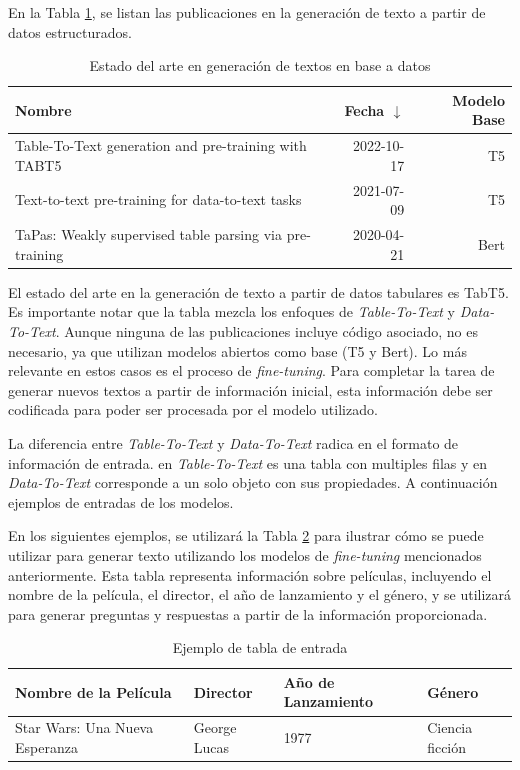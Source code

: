 En la Tabla \ref{tab-sota-text}, se listan las publicaciones en la generación de texto a partir de datos estructurados.

\begin{table}[H]
	\centering
	\caption{Estado del arte en generación de textos en base a datos}
	\label{tab-sota-text}
    \begin{tabular}{|m{20em}|r|r|}
        \hline
        \rowcolor[gray]{0.8}
        Nombre & Fecha $\downarrow$ & Modelo Base \\
        \hline
        Table-To-Text generation and pre-training with TABT5 \cite{andrejczuk_table--text_2022}
        & 2022-10-17
        & T5 \\
        \hline
        Text-to-text pre-training for data-to-text tasks \cite{kale_text--text_2020}
        & 2021-07-09
        & T5 \\
        \hline
        TaPas: Weakly supervised table parsing via pre-training \cite{herzig_tapas_2020}
        & 2020-04-21
        & Bert \\
        \hline
    \end{tabular}
\end{table}

El estado del arte en la generación de texto a partir de datos tabulares es TabT5. Es importante notar que la tabla mezcla los enfoques de \emph{Table-To-Text} y \emph{Data-To-Text}. Aunque ninguna de las publicaciones incluye código asociado, no es necesario, ya que utilizan modelos abiertos como base (T5 y Bert). Lo más relevante en estos casos es el proceso de \emph{fine-tuning}. Para completar la tarea de generar nuevos textos a partir de información inicial, esta información debe ser codificada para poder ser procesada por el modelo utilizado.

La diferencia entre \emph{Table-To-Text} y \emph{Data-To-Text} radica en el formato de información de entrada. en \emph{Table-To-Text} es una tabla con multiples filas y en \emph{Data-To-Text} corresponde a un solo objeto con sus propiedades. A continuación ejemplos de entradas de los modelos.


En los siguientes ejemplos, se utilizará la Tabla \ref{tabla-ejemplo-inputs} para ilustrar cómo se puede utilizar para generar texto utilizando los modelos de \emph{fine-tuning} mencionados anteriormente. Esta tabla representa información sobre películas, incluyendo el nombre de la película, el director, el año de lanzamiento y el género, y se utilizará para generar preguntas y respuestas a partir de la información proporcionada.
\begin{table}[H]
	\centering
	\caption{Ejemplo de tabla de entrada}
	\label{tabla-ejemplo-inputs}
    \begin{tabular}{|l|l|l|l|}
        \hline
        \rowcolor[gray]{0.8}
        Nombre de la Película & Director & Año de Lanzamiento & Género \\
        \hline
        Star Wars: Una Nueva Esperanza & George Lucas & 1977 & Ciencia ficción \\
        \hline
    \end{tabular}
        
\end{table}


